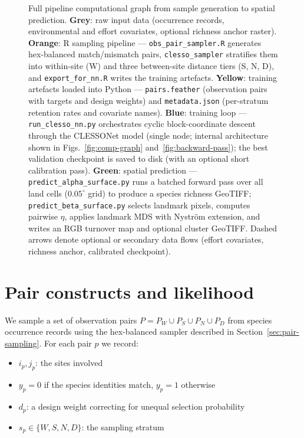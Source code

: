 \documentclass{article}
\begin{document}
\begin{figure}[p]
{\begin{tikzpicture}
\end{tikzpicture}
}%
\caption{%
Full pipeline computational graph from sample generation to spatial prediction.
\textbf{Grey}: raw input data (occurrence records, environmental and effort covariates, optional richness anchor raster).
\textbf{Orange}: R sampling pipeline --- \texttt{obs\_pair\_sampler.R} generates hex-balanced match/mismatch pairs, \texttt{clesso\_sampler} stratifies them into within-site (W) and three between-site distance tiers (S, N, D), and \texttt{export\_for\_nn.R} writes the training artefacts.
\textbf{Yellow}: training artefacts loaded into Python --- \texttt{pairs.feather} (observation pairs with targets and design weights) and \texttt{metadata.json} (per-stratum retention rates and covariate names).
\textbf{Blue}: training loop --- \texttt{run\_clesso\_nn.py} orchestrates cyclic block-coordinate descent through the CLESSONet model (single node; internal architecture shown in Figs.~\ref{fig:comp-graph} and~\ref{fig:backward-pass}); the best validation checkpoint is saved to disk (with an optional short calibration pass).
\textbf{Green}: spatial prediction --- \texttt{predict\_alpha\_surface.py} runs a batched forward pass over all land cells ($0.05^\circ$ grid) to produce a species richness GeoTIFF; \texttt{predict\_beta\_surface.py} selects landmark pixels, computes pairwise $\eta$, applies landmark MDS with Nystr\"{o}m extension, and writes an RGB turnover map and optional cluster GeoTIFF.
Dashed arrows denote optional or secondary data flows (effort covariates, richness anchor, calibrated checkpoint).%
}
\label{fig:full-pipeline}
\end{figure}

\section{Pair constructs and likelihood}

We sample a set of observation pairs $P = P_W \cup P_S \cup P_N \cup P_D$ from species occurrence records using the hex-balanced sampler described in Section~\ref{sec:pair-sampling}. For each pair $p$ we record:

\begin{itemize}
    \item $i_p, j_p$: the sites involved
    \item $y_p = 0$ if the species identities match, $y_p = 1$ otherwise
    \item $d_p$: a design weight correcting for unequal selection probability
    \item $s_p \in \{W, S, N, D\}$: the sampling stratum
\end{itemize}
\end{document}
